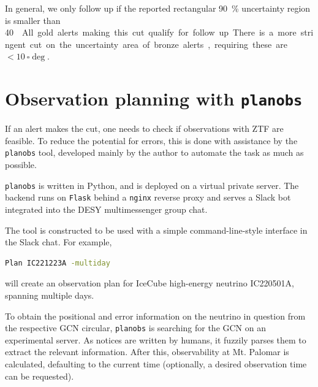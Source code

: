 \documentclass[
    a4paper, %
    fontsize=10pt, %
    twoside=true, %
    numbers=noenddot, %
    fontmethod=tex,
]{kaobook}
\begin{document}
In general, we only follow up if the reported rectangular \SI{90}{\percent} uncertainty region is smaller than \SI{40}{\square\deg}. All gold alerts making this cut qualify for follow up. There is a more stringent cut on the uncertainty area of bronze alerts, requiring these are $<\SI{10}{\square\deg}$.

\section{Observation planning with \texttt{planobs}}\label{planobs}
If an alert makes the cut, one needs to check if observations with ZTF are feasible. To reduce the potential for errors, this is done with assistance by the \texttt{planobs}  tool, developed mainly by the author to automate the task as much as possible.

\texttt{planobs} is written in Python, and is deployed on a virtual private server. The backend runs on \texttt{Flask} behind a \texttt{nginx} reverse proxy and serves a Slack bot integrated into the DESY multimessenger group chat.

The tool is constructed to be used with a simple command-line-style interface in the Slack chat. For example, 
\begin{lstlisting}[language=bash,style=kaolstplain]
Plan IC221223A -multiday
\end{lstlisting}
will create an observation plan for IceCube high-energy neutrino IC220501A, spanning multiple days.

To obtain the positional and error information on the neutrino in question from the respective GCN circular, \texttt{planobs} is searching for the GCN on an experimental server. As notices are written by humans, it fuzzily parses them to extract the relevant information. After this, observability at Mt. Palomar is calculated, defaulting to the current time (optionally, a desired observation time can be requested). 
\end{document}
